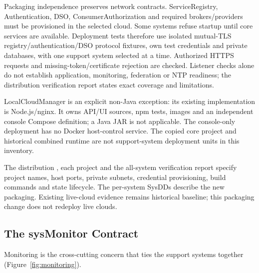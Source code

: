 \documentclass[a4paper]{arrowhead}
\begin{document}
Packaging independence preserves network contracts. ServiceRegistry, Authentication, DSO, ConsumerAuthorization and required brokers/providers must be provisioned in the selected cloud. Some systems refuse startup until core services are available. Deployment tests therefore use isolated mutual-TLS registry/authentication/DSO protocol fixtures, own test credentials and private databases, with one support system selected at a time. Authorized HTTPS requests and missing-token/certificate rejection are checked. Listener checks alone do not establish application, monitoring, federation or NTP readiness; the distribution verification report states exact coverage and limitations.

LocalCloudManager is an explicit non-Java exception: its existing implementation is Node.js/nginx. It owns API/UI sources, npm tests, images and an independent console Compose definition; a Java JAR is not applicable. The console-only deployment has no Docker host-control service. The copied core project and historical combined runtime are not support-system deployment units in this inventory.

The distribution , each project  and the all-system verification report specify project names, host ports, private subnets, credential provisioning, build commands and state lifecycle. The per-system SysDDs describe the new packaging. Existing live-cloud evidence remains historical baseline; this packaging change does not redeploy live clouds.

\subsection{The sysMonitor Contract}
\label{sec:sysmonitor}

Monitoring is the cross-cutting concern that ties the support systems together
(Figure~\ref{fig:monitoring}).
\end{document}
